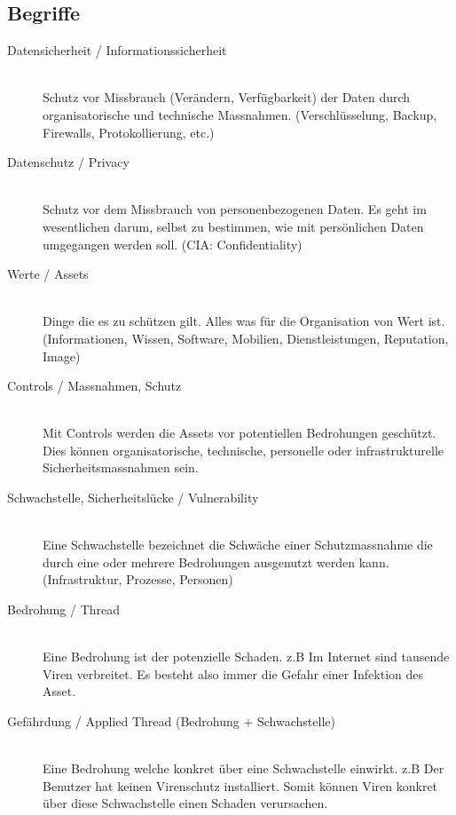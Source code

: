 \subsection{Begriffe}
\begin{description}
	\item[Datensicherheit / Informationssicherheit] \hfill \\
	Schutz vor Missbrauch (Verändern, Verfügbarkeit) der Daten durch organisatorische und technische Massnahmen. (Verschlüsselung, Backup, Firewalls, Protokollierung, etc.)
	\item[Datenschutz / Privacy] \hfill \\
	Schutz vor dem Missbrauch von personenbezogenen Daten. Es geht im wesentlichen darum, selbst zu bestimmen, wie mit persönlichen Daten umgegangen werden soll. (CIA: Confidentiality)
	\item[Werte / Assets] \hfill \\
	Dinge die es zu schützen gilt. Alles was für die Organisation von Wert ist. (Informationen, Wissen, Software, Mobilien, Dienstleistungen, Reputation, Image)
	\item[Controls / Massnahmen, Schutz] \hfill \\
	Mit Controls werden die Assets vor potentiellen Bedrohungen geschützt. Dies können organisatorische, technische, personelle oder infrastrukturelle Sicherheitsmassnahmen sein.
	\item [Schwachstelle, Sicherheitslücke / Vulnerability] \hfill \\
	Eine Schwachstelle bezeichnet die Schwäche einer Schutzmassnahme die durch eine oder mehrere Bedrohungen ausgenutzt werden kann. (Infrastruktur, Prozesse, Personen)
	\item[Bedrohung / Thread] \hfill \\
	Eine Bedrohung ist der potenzielle Schaden. z.B Im Internet sind tausende Viren verbreitet. Es besteht also immer die Gefahr einer Infektion des Asset.
	\item[Gefährdung / Applied Thread (Bedrohung + Schwachstelle)] \hfill \\
	Eine Bedrohung welche konkret über eine Schwachstelle einwirkt. z.B Der Benutzer hat keinen Virenschutz installiert. Somit können Viren konkret über diese Schwachstelle einen Schaden verursachen. 
\end{description}

